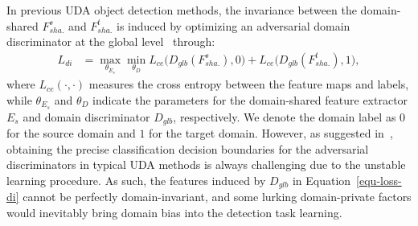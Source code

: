 \documentclass[journal]{IEEEtran}
\begin{document}
In previous UDA object detection methods, the invariance between the domain-shared $F_{sha.}^{s}$ and $F_{sha.}^{t}$ is induced by optimizing an adversarial domain discriminator at the global level~\cite{chen2018domain,saito2019strong,he2020domain} through:
\begin{equation}
\begin{aligned}
L_{di} & = \max\limits_{\theta_{E_{s}}} \min\limits_{\theta_{D}} L_{ce}\Big(D_{glb}(F_{sha.}^{s}), 0\Big) + L_{ce}\Big(D_{glb}(F_{sha.}^{t}), 1\Big),
\label{equ-loss-di}
\end{aligned}
\end{equation}
where $L_{ce}(\cdot, \cdot)$ measures the cross entropy between the feature maps and labels, while $\theta_{E_{s}}$ and $\theta_{D}$ indicate the parameters for the domain-shared feature extractor $E_{s}$ and domain discriminator $D_{glb}$, respectively. We denote the domain label as $0$ for the source domain and $1$ for the target domain. However, as suggested in~\cite{arjovsky2017wasserstein,cai2019learning}, obtaining the precise classification decision boundaries for the adversarial discriminators in typical UDA methods is always challenging due to the unstable learning procedure. As such, the features induced by $D_{glb}$ in Equation~\ref{equ-loss-di} cannot be perfectly domain-invariant, and some lurking domain-private factors would inevitably bring domain bias into the detection task learning. {}
\end{document}
